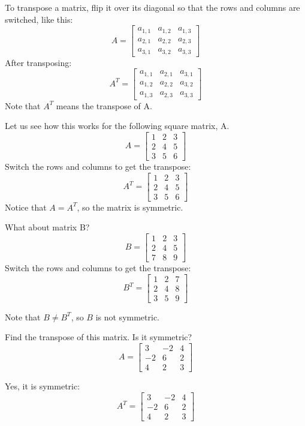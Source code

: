 To transpose a matrix, flip it over its diagonal so that the rows and columns are switched, like this:
$$
A = \begin{bmatrix}
a_{1,1} & a_{1,2} & a_{1,3} \\
a_{2,1} & a_{2,2} & a_{2,3} \\
a_{3,1} & a_{3,2} & a_{3,3}
\end{bmatrix}
$$
After transposing:
$$
A^T = \begin{bmatrix}
a_{1,1} & a_{2,1} & a_{3,1} \\
a_{1,2} & a_{2,2} & a_{3,2} \\
a_{1,3} & a_{2,3} & a_{3,3}
\end{bmatrix}
$$
Note that $A^T$ means the transpose of A. 

Let us see how this works for the following square matrix, A.
$$
A = \begin{bmatrix}
1 & 2 & 3 \\
2 & 4 & 5 \\
3 & 5 & 6
\end{bmatrix}
$$
Switch the rows and columns to get the transpose:
$$
A^T = \begin{bmatrix}
1 & 2 & 3 \\
2 & 4 & 5 \\
3 & 5 & 6
\end{bmatrix}
$$
Notice that $A = A^T$, so the matrix is symmetric.

What about matrix B? 
$$
B = \begin{bmatrix}
1 & 2 & 3 \\
2 & 4 & 5 \\
7 & 8 & 9
\end{bmatrix}
$$
Switch the rows and columns to get the transpose:
$$
B^T = \begin{bmatrix}
1 & 2 & 7 \\
2 & 4 & 8 \\
3 & 5 & 9
\end{bmatrix}
$$

Note that $B \neq B^T$, so $B$ is not symmetric.

\begin{Exercise}[title={Matrix Transposition}, label=matrix-transpose01]
Find the transpose of this matrix. Is it symmetric? 
$$A = \begin{bmatrix}
 		3 & -2 &4  \\
 		-2 & 6 &2 \\
 		4 & 2 & 3 
	  \end{bmatrix}$$
\end{Exercise}
\begin{Answer}[ref=matrix-transpose01]
Yes, it is symmetric:
$$A^T = 
	  \begin{bmatrix}
 		3 & -2 & 4  \\
 		-2 & 6 & 2 \\
 		4 & 2 & 3 
	\end{bmatrix}$$
\end{Answer}

